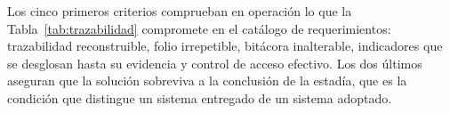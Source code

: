 Los cinco primeros criterios comprueban en operación lo que la Tabla~\ref{tab:trazabilidad} compromete en el catálogo de requerimientos: trazabilidad reconstruible, folio irrepetible, bitácora inalterable, indicadores que se desglosan hasta su evidencia y control de acceso efectivo. Los dos últimos aseguran que la solución sobreviva a la conclusión de la estadía, que es la condición que distingue un sistema entregado de un sistema adoptado.
